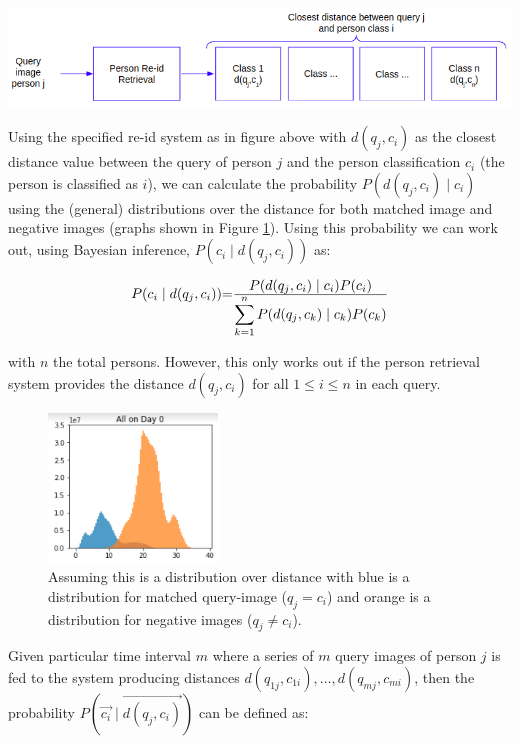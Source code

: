 \documentclass[10pt,a4paper,final]{article}
\begin{document}
\includegraphics[width=\textwidth]{figures/third_idea.png}

Using the specified re-id system as in figure above with $d(q_j, c_i)$ as the closest distance value between the query of person $j$ and the person classification $c_i$ (the person is classified as $i$), we can calculate the probability $P(d(q_j, c_i) \mid c_i)$ using the (general) distributions over the distance for both matched image and negative images (graphs shown in Figure \ref{fig:match_mismatch_dist}). Using this probability we can work out, using Bayesian inference, $P(c_i \mid d(q_j, c_i))$ as:

\begin{equation}
	\label{eq:third_idea}
	\begin{tabular}{r@{=}l}
		$P(c_i \mid d(q_j, c_i))$ & $\frac{\displaystyle P(d(q_j, c_i) \mid c_i) P(c_i)}{\displaystyle\sum_{k=1}^{n} P(d(q_j, c_k) \mid c_k) P(c_k)}$ \\ 
	\end{tabular}
\end{equation}

\noindent with $n$ the total persons. However, this only works out if the person retrieval system provides the distance $d(q_j, c_i)$ for all $1 \leq i \leq n$ in each query.

\begin{figure}
	\centering
	\includegraphics[width=0.40\textwidth]{./figures/match_mismatch_dist.png}
	\caption{Assuming this is a distribution over distance with blue is a distribution for matched query-image ($q_j = c_i$) and orange is a distribution for negative images ($q_j \neq c_i$).}
	\label{fig:match_mismatch_dist}
\end{figure}

Given particular time interval $m$ where a series of $m$ query images of person $j$ is fed to the system producing distances $d(q_{1j}, c_{1i}), \ldots, d(q_{mj}, c_{mi})$, then the probability $P(\overrightarrow{c_i} \mid \overrightarrow{d(q_j, c_i)})$ can be defined as:
\end{document}
